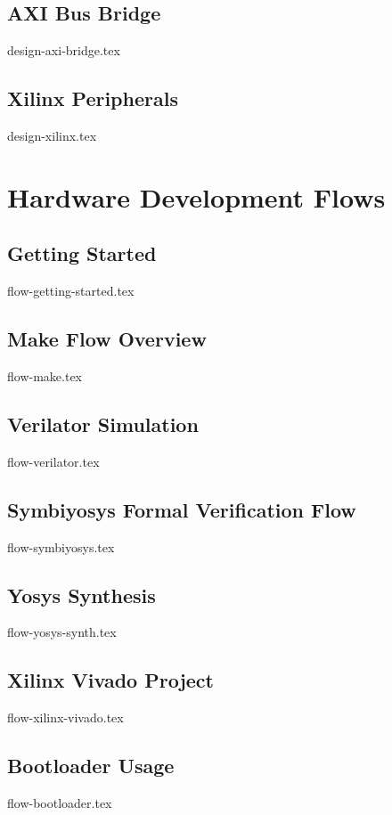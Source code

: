 \documentclass{scarv-report}
\begin{document}
\subsection{AXI Bus Bridge}
{design-axi-bridge.tex}

\subsection{Xilinx Peripherals}
{design-xilinx.tex}

\section{Hardware Development Flows}
\label{sec:hw-flows}

\subsection{Getting Started}
{flow-getting-started.tex}

\subsection{Make Flow Overview}
{flow-make.tex}

\subsection{Verilator Simulation}
{flow-verilator.tex}

\subsection{Symbiyosys Formal Verification Flow}
{flow-symbiyosys.tex}

\subsection{Yosys Synthesis}
{flow-yosys-synth.tex}

\subsection{Xilinx Vivado Project}
{flow-xilinx-vivado.tex}

\subsection{Bootloader Usage}
{flow-bootloader.tex}
\end{document}
